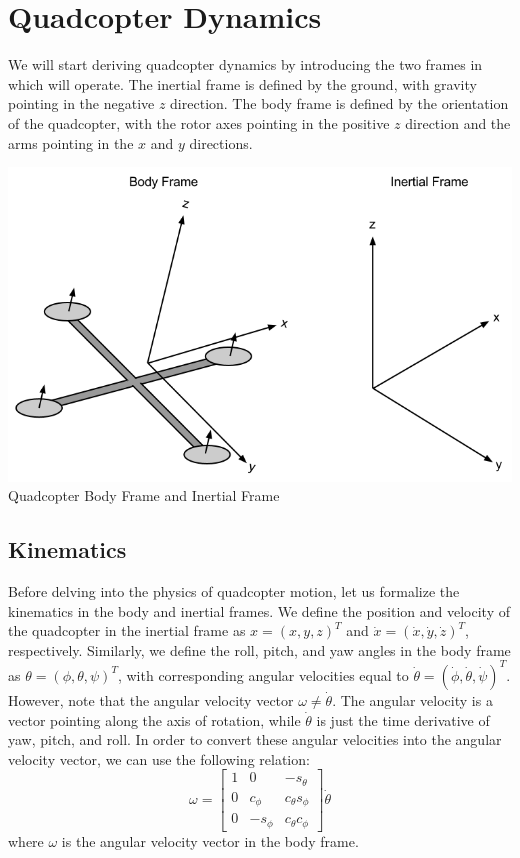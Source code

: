 \documentclass{article}
\newcommand\bmatr[1]{\begin{bmatrix} #1\end{bmatrix}}
\begin{document}
\newpage
\section*{Quadcopter Dynamics}
We will start deriving quadcopter dynamics by introducing the two frames in which will operate. The
inertial frame is defined by the ground, with gravity pointing in the negative $z$ direction. The
body frame is defined by the orientation of the quadcopter, with the rotor axes pointing in the
positive $z$ direction and the arms pointing in the $x$ and $y$ directions.
\begin{center}
    \includegraphics[scale=0.3]{images/Quadcopter_Coordinates.png} \\
    {Quadcopter Body Frame and Inertial Frame}
\end{center}

\subsection*{Kinematics}
Before delving into the physics of quadcopter motion, let us formalize the kinematics in the body
and inertial frames. We define the position and velocity of the quadcopter in the inertial frame as
$x = ({x , y , z})^T$ and $\dot x = ({\dot x , \dot y , \dot z})^T$, respectively.
Similarly, we define the roll, pitch, and yaw angles in the body frame as
$\theta = ({\phi , \theta , \psi})^T$, with corresponding angular velocities equal to
$\dot \theta =  ({\dot \phi , \dot \theta , \dot \psi})^T$.
However, note that the angular velocity vector $\omega \ne \dot \theta$. The angular velocity is a vector
pointing along the axis of rotation, while $\dot \theta$ is just the time derivative of yaw, pitch,
and roll.  In order to convert these angular velocities into the angular velocity vector, we can use
the following relation:
\[\omega = \bmatr{
    1 &0 & -s_\theta \\
    0 & c_\phi & c_\theta s_\phi \\
    0 & -s_\phi & c_\theta c_\phi
} \dot\theta\]
where $\omega$ is the angular velocity vector in the body frame.
\end{document}
